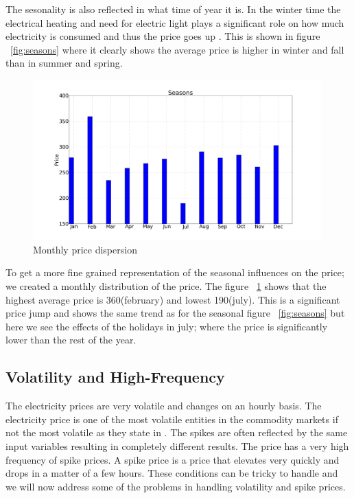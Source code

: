 The sesonality is also reflected in what time of year it is. In the winter time the electrical heating and need for electric light plays a significant role on how much electricity is consumed and thus the price goes up \cite{crowley2005weather}. This is shown in figure ~\ref{fig:seasons} where it clearly shows the average price is higher in winter and fall than in summer and spring.

\begin{figure}[H]
\centering
\includegraphics[width=0.99\textwidth ]{billeder/energy_price_plots/averageMonthlyPrice.png}
\caption{Monthly price dispersion}
\label{fig:monthlyAveragePrice}
\end{figure}

To get a more fine grained representation of the seasonal influences on the price; we created a monthly distribution of the price. The figure ~\ref{fig:monthlyAveragePrice} shows that the highest average price is 360(february) and lowest 190(july). This is a significant price jump and shows the same trend as for the seasonal figure ~\ref{fig:seasons} but here we see the effects of the holidays in july; where the price is significantly lower than the rest of the year.

\subsection{Volatility and High-Frequency}
\label{sec:volatility}
The electricity prices are very volatile and changes on an hourly basis. The electricity price is one of the most volatile entities in the commodity markets \cite{pjmForecast} if not the most volatile as they state in \cite{yamin2004adaptive}. The spikes are often reflected by the same input variables resulting in completely different results. The price has a very high frequency of spike prices. A spike price is a price that elevates very quickly and drops in a matter of a few hours. These conditions can be tricky to handle and we will now address some of the problems in handling volatility and spike prices.

